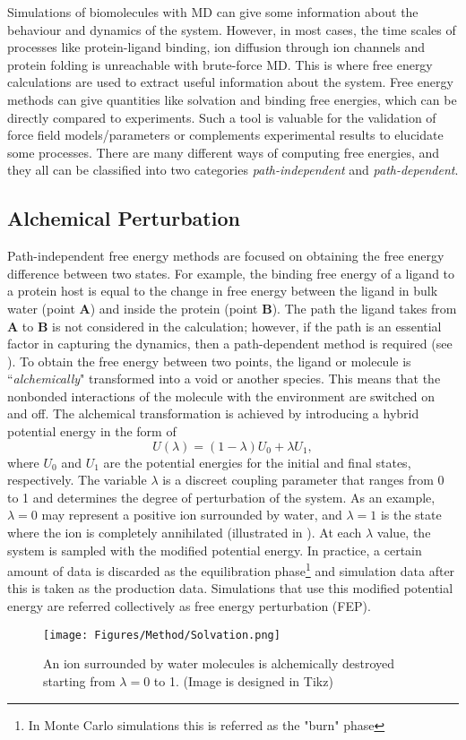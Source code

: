 \vskip 0.5cm

Simulations of biomolecules with MD can give some information about the behaviour and dynamics 
of the system. However, in most cases, the time scales of processes like protein-ligand binding, 
ion diffusion through ion channels and protein folding is unreachable with brute-force MD. This 
is where free energy calculations are used to extract useful information about the system. Free 
energy methods can give quantities like solvation and binding free energies, which can be directly 
compared to experiments. Such a tool is valuable for the validation of force field models/parameters 
or complements experimental results to elucidate some processes. There are many different ways of 
computing free energies, and they all can be classified into two categories 
\textit{path-independent} and \textit{path-dependent}. 

\subsection{Alchemical Perturbation}
Path-independent free energy methods are focused on obtaining the free energy difference between 
two states. For example, the binding free energy of a ligand to a protein host is equal to the 
change in free energy between the ligand in bulk water (point \textbf{A}) and inside the protein 
(point \textbf{B}). The path the ligand takes from \textbf{A} to \textbf{B} is not considered in 
the calculation; however, if the path is an essential factor in capturing the dynamics, then a 
path-dependent method is required (see ). To obtain the free energy between two 
points, the ligand or molecule is ``{\it alchemically}" transformed into a void or another species. 
This means that the nonbonded interactions of the molecule with the environment are switched on 
and off. The alchemical transformation is achieved by introducing a hybrid potential energy in the 
form of
\begin{equation}
U(\lambda) = (1-\lambda)U_{0} + \lambda U_{1},
\end{equation}
where $U_{0}$ and $U_{1}$ are the potential energies for the initial and final states, respectively. 
The variable $\lambda$ is a discreet coupling parameter that ranges from 0 to 1 and determines 
the degree of perturbation of the system. As an example, $\lambda=0$ may represent a positive 
ion surrounded by water, and $\lambda=1$ is the state where the ion is completely annihilated 
(illustrated in ). At each $\lambda$ value, the system is sampled with the 
modified potential energy. In practice, a certain amount of data is discarded as the equilibration 
phase\footnote{In Monte Carlo simulations this is referred as the "burn" phase} and simulation 
data after this is taken as the production data. Simulations that use this modified potential 
energy are referred collectively as free energy perturbation (FEP).
\begin{figure}[t!]
\centering
\texttt{[image: Figures/Method/Solvation.png]}
\caption{An ion surrounded by water molecules is alchemically destroyed 
starting from $\lambda=0$ to 1. (Image is designed in Tikz)}
\label{method:solv}
\end{figure}

